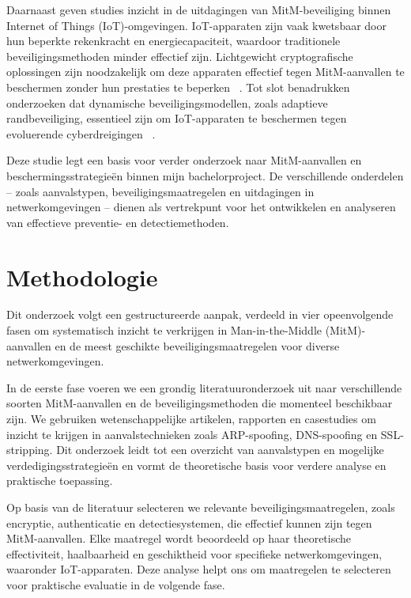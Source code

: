 Daarnaast geven studies inzicht in de uitdagingen van MitM-beveiliging binnen Internet of Things (IoT)-omgevingen. IoT-apparaten zijn vaak kwetsbaar door hun beperkte rekenkracht en energiecapaciteit, waardoor traditionele beveiligingsmethoden minder effectief zijn. Lichtgewicht cryptografische oplossingen zijn noodzakelijk om deze apparaten effectief tegen MitM-aanvallen te beschermen zonder hun prestaties te beperken ~\autocite{ANKARI2022}. Tot slot benadrukken onderzoeken dat dynamische beveiligingsmodellen, zoals adaptieve randbeveiliging, essentieel zijn om IoT-apparaten te beschermen tegen evoluerende cyberdreigingen ~\autocite{HALGAMUGE2025}.

Deze studie legt een basis voor verder onderzoek naar MitM-aanvallen en beschermingsstrategieën binnen mijn bachelorproject. De verschillende onderdelen – zoals aanvalstypen, beveiligingsmaatregelen en uitdagingen in  netwerkomgevingen – dienen als vertrekpunt voor het ontwikkelen en analyseren van effectieve preventie- en detectiemethoden.



\section{Methodologie}%
\label{sec:methodologie}
Dit onderzoek volgt een gestructureerde aanpak, verdeeld in vier opeenvolgende fasen om systematisch inzicht te verkrijgen in Man-in-the-Middle (MitM)-aanvallen en de meest geschikte beveiligingsmaatregelen voor diverse netwerkomgevingen.

In de eerste fase voeren we een grondig literatuuronderzoek uit naar verschillende soorten MitM-aanvallen en de beveiligingsmethoden die momenteel beschikbaar zijn. We gebruiken wetenschappelijke artikelen, rapporten en casestudies om inzicht te krijgen in aanvalstechnieken zoals ARP-spoofing, DNS-spoofing en SSL-stripping. Dit onderzoek leidt tot een overzicht van aanvalstypen en mogelijke verdedigingsstrategieën en vormt de theoretische basis voor verdere analyse en praktische toepassing.


Op basis van de literatuur selecteren we relevante beveiligingsmaatregelen, zoals encryptie, authenticatie en detectiesystemen, die effectief kunnen zijn tegen MitM-aanvallen. Elke maatregel wordt beoordeeld op haar theoretische effectiviteit, haalbaarheid en geschiktheid voor specifieke netwerkomgevingen, waaronder IoT-apparaten. Deze analyse helpt ons om maatregelen te selecteren voor praktische evaluatie in de volgende fase.

